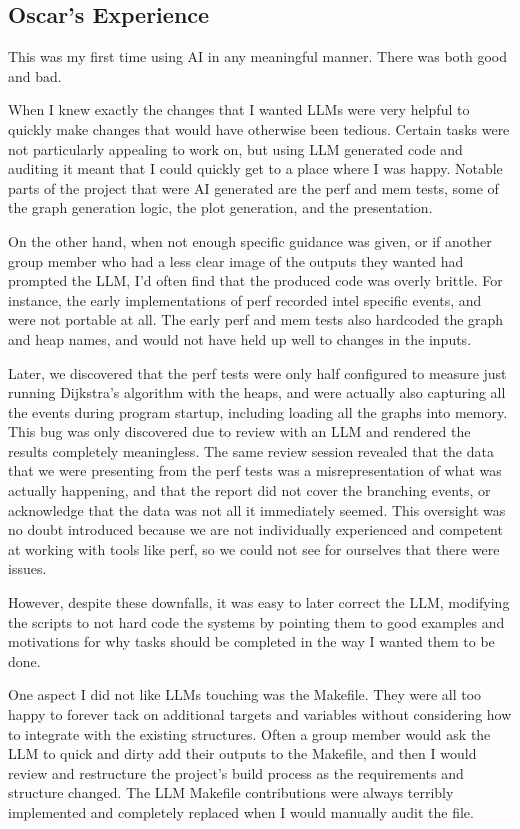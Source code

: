 \subsection{Oscar's Experience}

This was my first time using AI in any meaningful manner. There was both good
and bad.

When I knew exactly the changes that I wanted LLMs were very helpful to quickly
make changes that would have otherwise been tedious. Certain tasks were not
particularly appealing to work on, but using LLM generated code and auditing it
meant that I could quickly get to a place where I was happy. Notable parts of
the project that were AI generated are the perf and mem tests, some of the graph
generation logic, the plot generation, and the presentation.

On the other hand, when not enough specific guidance was given, or if another
group member who had a less clear image of the outputs they wanted had prompted
the LLM, I'd often find that the produced code was overly brittle. For instance,
the early implementations of perf recorded intel specific events, and were not
portable at all. The early perf and mem tests also hardcoded the graph and heap
names, and would not have held up well to changes in the inputs.

Later, we discovered that the perf tests were only half configured to measure
just running Dijkstra's algorithm with the heaps, and were actually also capturing all the
events during program startup, including loading all the graphs into memory.
This bug was only discovered due to review with an LLM and rendered the results
completely meaningless. The same review session revealed that the data that we
were presenting from the perf tests was a misrepresentation of what was actually
happening, and that the report did not cover the branching events, or
acknowledge that the data was not all it immediately seemed. This oversight was
no doubt introduced because we are not individually experienced and competent at
working with tools like perf, so we could not see for ourselves that there were
issues.

However, despite these downfalls, it was easy to later correct the LLM,
modifying the scripts to not hard code the systems by pointing them to good
examples and motivations for why tasks should be completed in the way I wanted
them to be done.

One aspect I did not like LLMs touching was the Makefile. They were all too
happy to forever tack on additional targets and variables without considering
how to integrate with the existing structures. Often a group member would ask
the LLM to quick and dirty add their outputs to the Makefile, and then I would
review and restructure the project's build process as the requirements and
structure changed. The LLM Makefile contributions were always terribly
implemented and completely replaced when I would manually audit the file.

